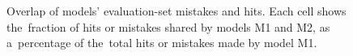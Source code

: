 \documentclass[bsc,frontabs,singlespacing,parskip,deptreport]{infthesis}
\begin{document}
{\begin{figure}[h!tb]
    \label{fig:probing-students-scratch}
  \end{figure}
  \begin{figure}[h!tb]
    \centering
    \caption{Overlap of models' evaluation-set mistakes and hits. Each cell shows the~fraction of hits or mistakes shared by models M1 and M2, as a~percentage of the~total hits or mistakes made by model M1.}
    \label{fig:hits-mistakes-overlap-all}
  \end{figure}

  
}
\end{document}
